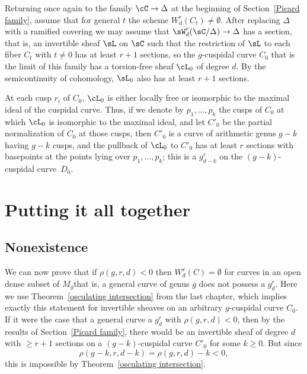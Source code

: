 Returning once again to the family $\cC \to \Delta$ at the beginning
of Section~\ref{Picard family}, assume that for general $t$ the scheme
$W^{r}_{d}(C_t)\neq \emptyset$. After replacing $\Delta$ with a
ramified covering we may assume that
$\sW^{r}_{d}(\sC/\Delta) \to \Delta$ has a section, that is, an
invertible sheaf $\sL$ on $\sC$ such that the restriction of $\sL$ to
each fiber $C_{t}$ with $t\neq 0$ has at least $r+1$ sections, so the
$g$-cuspidal curve $C_0$ that is the limit of this family has a
torsion-free sheaf $\cL_0$ of degree $d$. By the semicontinuity of
%
cohomology, $\sL_{0}$ also has at least $r+1$ sections.

At each cusp $r_i$ of $C_0$, $\cL_0$ is either locally free or
isomorphic to the maximal ideal of the cuspidal curve. Thus, if we
denote by $p_1,\dots, p_k$ the cusps of $C_0$ at which $\cL_0$ is
isomorphic to the maximal ideal, and let $C'_{0}$ be the partial
normalization of $C_0$ at those cusps, then $C'_{0}$ is a curve of
arithmetic genus $g-k$ having $g-k$ cusps, and the pullback of $\cL_0$
to $C'_{0}$ has at least $r$ sections with basepoints at the points
lying over $p_1,\dots,p_k$;  this is a $g^r_{d-k}$ on the
$(g-k)$-cuspidal curve~$D_0$.

\section{Putting it all together}
\label{nonexistence}

\subsection*{Nonexistence}

We can now prove that if $\rho(g,r,d) < 0$  then $W^{r}_{d}(C) =
\emptyset$ for curves in an open dense subset of $M_{g}$\emdash that is,
a general curve of genus $g$ does not possess a $g^r_d$.
Here we use Theorem~\ref{osculating intersection} from the last chapter,
which implies exactly this statement for invertible sheaves on an
arbitrary $g$-cuspidal curve $C_0$. If it were the case that a general
curve 
a $g^r_d$ with $\rho(g,r,d) < 0$, then by the results
of Section~\ref{Picard family}, there would be
 an invertible sheaf of degree $d$ with $\geq r+1$ sections on a
 $(g-k)$-cuspidal curve  $ C'_0$ for some $k \geq 0$. But since
$$
\rho(g-k, r, d-k) = \rho(g,r,d) - k < 0
,
$$
this is impossible by Theorem~\ref{osculating intersection}.


